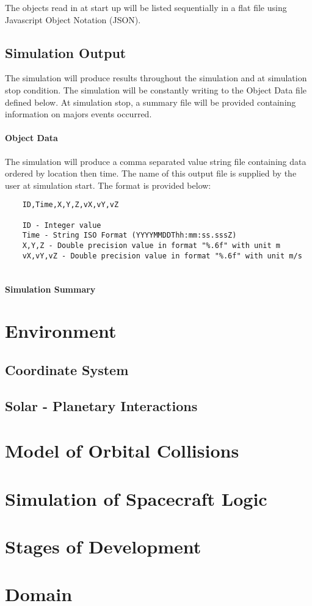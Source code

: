 \documentclass{article}
\begin{document}
  The objects read in at start up will be listed sequentially in a flat file using Javascript Object Notation (JSON).
  
  \subsection{Simulation Output}
  
	The simulation will produce results throughout the simulation and at simulation stop condition. The simulation will be constantly writing to the Object Data file defined below. At simulation stop, a summary file will be provided containing information on majors events occurred. 
  
  \paragraph{Object Data}
  
  The simulation will produce a comma separated value string file containing data ordered by location then time. The name of this output file is supplied by the user at simulation start. The format is provided below:
  
  \begin{verbatim}
  	ID,Time,X,Y,Z,vX,vY,vZ
  	
  	ID - Integer value
  	Time - String ISO Format (YYYYMMDDThh:mm:ss.sssZ)
  	X,Y,Z - Double precision value in format "%.6f" with unit m
  	vX,vY,vZ - Double precision value in format "%.6f" with unit m/s  	
  	
  \end{verbatim}
  
  \paragraph{Simulation Summary}
  
  \section{Environment}  
  
  \subsection{Coordinate System}
  
  \subsection{Solar - Planetary Interactions}
   
  \section{Model of Orbital Collisions}
  
  \section{Simulation of Spacecraft Logic}
  
  \section{Stages of Development}
  
  \section{Domain}
  
  
\end{document}
